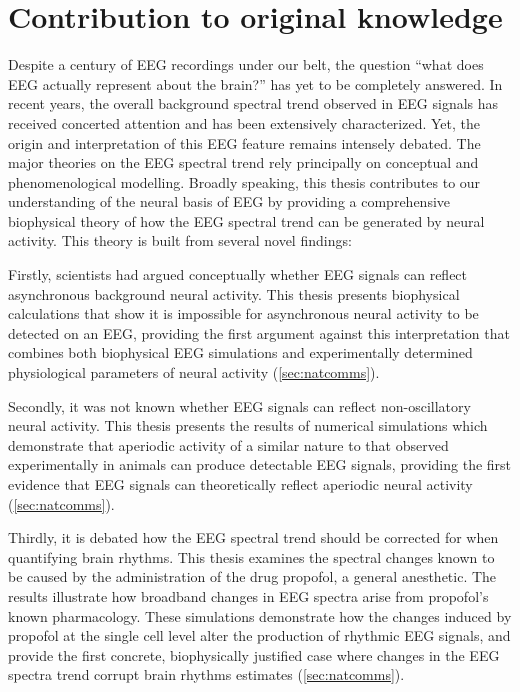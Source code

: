 \chapter*{Contribution to original knowledge}
\renewcommand{\chapterautorefname}{Chapter}

Despite a century of EEG recordings under our belt, the question ``what does EEG actually represent about the brain?'' has yet to be completely answered. In recent years, the overall background spectral trend observed in EEG signals has received concerted attention and has been extensively characterized. Yet, the origin and interpretation of this EEG feature remains intensely debated. The major theories on the EEG spectral trend rely principally on conceptual and phenomenological modelling. Broadly speaking, this thesis contributes to our understanding of the neural basis of EEG by providing a comprehensive biophysical theory of how the EEG spectral trend can be generated by neural activity. This theory is built from several novel findings:

Firstly, scientists had argued conceptually whether EEG signals can reflect asynchronous background neural activity. This thesis presents biophysical calculations that show it is impossible for asynchronous neural activity to be detected on an EEG, providing the first argument against this interpretation that combines both biophysical EEG simulations and experimentally determined physiological parameters of neural activity (\autoref{sec:natcomms}). 

Secondly, it was not known whether EEG signals can reflect non-oscillatory neural activity. This thesis presents the results of numerical simulations which demonstrate that aperiodic activity of a similar nature to that observed experimentally in animals can produce detectable EEG signals, providing the first evidence that EEG signals can theoretically reflect aperiodic neural activity (\autoref{sec:natcomms}).

Thirdly, it is debated how the EEG spectral trend should be corrected for when quantifying brain rhythms. This thesis examines the spectral changes known to be caused by the administration of the drug propofol, a general anesthetic. The results illustrate how broadband changes in EEG spectra arise from propofol's known pharmacology. These simulations demonstrate how the changes induced by propofol at the single cell level alter the production of rhythmic EEG signals, and provide the first concrete, biophysically justified case where changes in the EEG spectra trend corrupt brain rhythms estimates (\autoref{sec:natcomms}).


